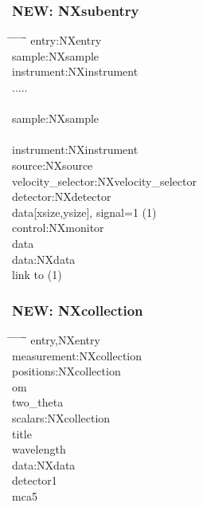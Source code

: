 \documentclass{beamer}
\begin{document}
\begin{frame} \frametitle{{\color{red}NEW}: NXsubentry}
\begin{tabbing}
\hspace*{1cm} \= \hspace*{1cm} \= \hspace*{1cm} \= \hspace*{1cm} \= \hspace*{1cm} \= \hspace*{1cm}\= \kill
entry:NXentry \\
\>sample:NXsample\\
\>instrument:NXinstrument\\
\>.....\\
 \\
 \>  \>sample:NXsample \\
\\
\> \>instrument:NXinstrument\\
\> \> \> source:NXsource\\
\> \> \> velocity\_selector:NXvelocity\_selector\\
\> \> \> detector:NXdetector \\
\> \> \> \>data[xsize,ysize], signal=1 (1)\\
\> \>control:NXmonitor\\
\> \> \>data\\
\> \>data:NXdata\\
\> \> \> link to (1)\\
\end{tabbing}
\end{frame}

\begin{frame} \frametitle{{\color{red}NEW: NXcollection}}
\begin{tabbing}
\hspace*{1cm} \= \hspace*{1cm} \= \hspace*{1cm} \= \hspace*{1cm} \= \hspace*{1cm} \= \hspace*{1cm}\= \kill
\>entry,NXentry\\
\> \>measurement:NXcollection\\
\> \> \>positions:NXcollection\\
\> \> \> \>om \\
\> \> \> \>two\_theta\\
\> \> \>scalars:NXcollection\\
\> \> \> \>title\\
\> \> \> \>wavelength\\
\> \> \>data:NXdata\\
\> \> \> \>detector1\\
\> \> \> \>mca5\\
\end{tabbing}
\end{frame}
\end{document}
